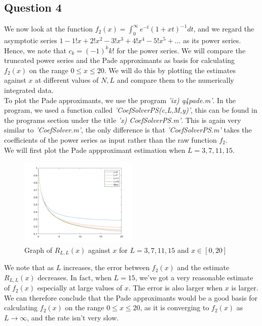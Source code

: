 \documentclass[10pt]{article}
\begin{document}
\subsection*{Question 4}
We now look at the function $f_2(x)=\int^{\infty}_0 e^{-t}(1+xt)^{-1}dt$, and we regard the asymptotic series $1-1!x+2!x^2-3!x^3+4!x^4-5!x^5+\dots$ as its power series. Hence, we note that $c_k=(-1)^kk!$ for the power series. We will compare the truncated power series and the Pade approximants as basis for calculating $f_2(x)$ on the range $0\leq x\leq20$. We will do this by plotting the estimates against $x$ at different values of $N,L$ and compare them to the numerically integrated data.\\
To plot the Pade approximants, we use the program \emph{'ix) q4\textunderscore pade.m'}. In the program, we used a function called \emph{'CoefSolverPS(c,L,M,y)'}, this can be found in the programs section under the title \emph{'x) CoefSolverPS.m'}. This is again very similar to \emph{'CoefSolver.m'}, the only difference is that \emph{'CoefSolverPS.m'} takes the coefficients of the power series as input rather than the raw function $f_2$.\\
We will first plot the Pade appproximant estimation when $L=3,7,11,15$.
\begin{figure}[H]
\centering
\includegraphics[width=0.5\textwidth]{Files/q4,L=3,7,11,15.png}
\caption{Graph of $R_{L,L}(x)$ against $x$ for $L=3,7,11,15$ and $x\in[0,20]$}
\end{figure}
\noindent We note that as $L$ increases, the error between $f_2(x)$ and the estimate $R_{L,L}(x)$ decreases. In fact, when $L=15$, we've got a very reasonable estimate of $f_2(x)$ especially at large values of $x$. The error is also larger when $x$ is larger.\\
We can therefore conclude that the Pade approximants would be a good basis for calculating $f_2(x)$ on the range $0\leq x\leq20$, as it is converging to $f_2(x)$ as $L\to\infty$, and the rate isn't very slow.\\
\end{document}
